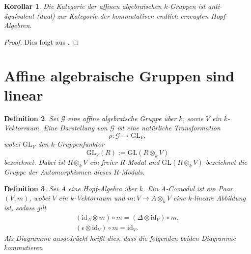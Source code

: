 \documentclass[a4paper, 11pt]{scrartcl}
\newcommand{\id}{\text{id}}
\theoremstyle{basicstyle}
\newtheorem{definition}{Definition}[section]
\newtheorem{korollar}[definition]{Korollar}
\begin{document}
    \begin{korollar}
        Die Kategorie der affinen algebraischen \(k\)-Gruppen ist anti-äquivalent (dual) zur Kategorie der kommutativen endlich erzeugten Hopf-Algebren.
    \end{korollar}
    \begin{proof}
        Dies folgt aus .
    \end{proof}


    \section{Affine algebraische Gruppen sind linear}

    \begin{definition}
        Sei \(\mathcal{G}\) eine affine algebraische Gruppe über \(k\), sowie \(V\) ein \(k\)-Vektorraum.
        Eine \emph{Darstellung} von \(\mathcal{G}\) ist eine natürliche Transformation
        \[\rho : \mathcal{G} \longrightarrow \text{GL}_V,\]
        wobei \(\text{GL}_V\) den \(k\)-Gruppenfunktor
        \[\text{GL}_V(R) := \text{GL}(R \otimes_k V)\]
        bezeichnet.
        Dabei ist \(R \otimes_k V\) ein freier \(R\)-Modul und \(\text{GL}(R \otimes_k V)\) bezeichnet die Gruppe der Automorphismen dieses \(R\)-Moduls.
    \end{definition}

    \begin{definition}
        Sei \(A\) eine Hopf-Algebra über \(k\).
        Ein \emph{\(A\)-Comodul} ist ein Paar \((V, m)\), wobei \(V\) ein \(k\)-Vektorraum und \(m: V \to A \otimes_k V\) eine \(k\)-lineare Abbildung ist, sodass gilt %
        \begin{gather*}
            (\id_A \otimes m) \circ m = (\Delta \otimes \id_V) \circ m, \\
            (\epsilon \otimes \id_V) \circ m = \id_V.
        \end{gather*}
        Als Diagramme ausgedrückt heißt dies, dass die folgenden beiden Diagramme kommutieren
        \begin{figure*}[ht!]
            \centering
            \hspace*{4em}
        \end{figure*}
    \end{definition}
\end{document}

